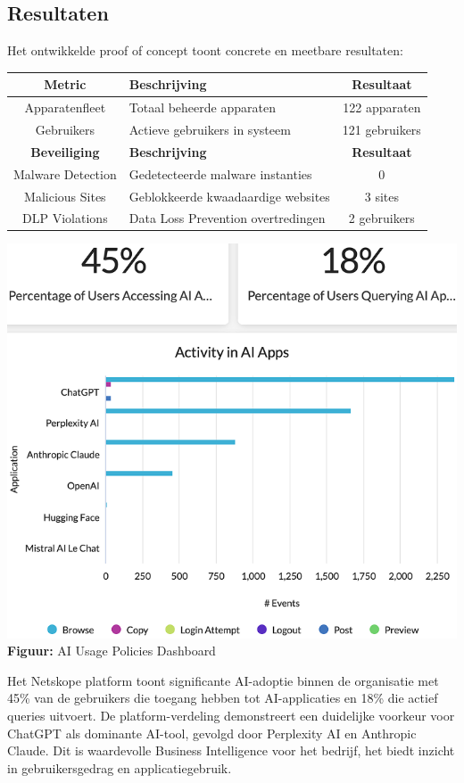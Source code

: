 \documentclass[a0,portrait]{hogent-poster}
\begin{document}
\begin{multicols}{2}
\vspace{1ex}

\section{Resultaten}
Het ontwikkelde proof of concept toont concrete en meetbare resultaten:
\begin{center}
\renewcommand{\arraystretch}{1.7}
\begin{tabular}{|c|p{20cm}|c|}
\hline
\rowcolor{gray!20}
\textbf{Metric} & \textbf{Beschrijving} & \textbf{Resultaat} \\
\hline
\rowcolor{blue!15}
Apparatenfleet & Totaal beheerde apparaten & 122 apparaten \\
\hline
\rowcolor{purple!15}
Gebruikers & Actieve gebruikers in systeem & 121 gebruikers \\
\hline
\rowcolor{gray!20}
\textbf{Beveiliging} & \textbf{Beschrijving} & \textbf{Resultaat} \\
\hline
\rowcolor{green!15}
Malware Detection & Gedetecteerde malware instanties & 0 \\
\hline
\rowcolor{red!15}
Malicious Sites & Geblokkeerde kwaadaardige websites & 3 sites \\
\hline
\rowcolor{orange!15}
DLP Violations & Data Loss Prevention overtredingen & 2 gebruikers \\
\hline
\end{tabular}
\end{center}

\begin{center}
\includegraphics[width=0.9\columnwidth]{../graphics/AI-usage.png}\\
\textbf{Figuur:} AI Usage Policies Dashboard
\end{center}
Het Netskope platform toont significante AI-adoptie binnen de organisatie met 45\% van de gebruikers die toegang hebben tot AI-applicaties en 18\% die actief queries uitvoert. De platform-verdeling demonstreert een duidelijke voorkeur voor ChatGPT als dominante AI-tool, gevolgd door Perplexity AI en Anthropic Claude. Dit is waardevolle Business Intelligence voor het bedrijf, het biedt inzicht in gebruikersgedrag en applicatiegebruik.


\end{multicols}
\end{document}
